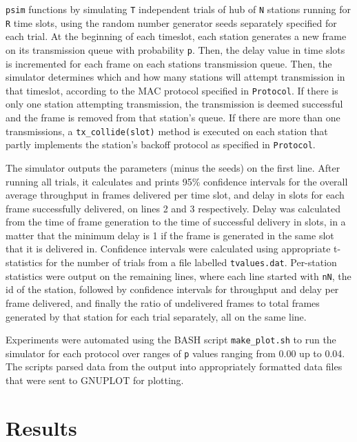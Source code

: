 \documentclass[twocolumn]{article}
\begin{document}
\verb|psim| functions by simulating \verb|T| independent trials of hub of
\verb|N| stations running for \verb|R| time slots, using the random number
generator seeds separately specified for each trial. At the beginning of each
timeslot, each station generates a new frame on its transmission queue with
probability \verb|p|. Then, the delay value in time slots is incremented for
each frame on each stations transmission queue.  Then, the simulator determines
which and how many stations will attempt transmission in that timeslot,
according to the MAC protocol specified in \verb|Protocol|. If there is only one
station attempting transmission, the transmission is deemed successful and the
frame is removed from that station's queue. If there are more than one
transmissions, a \verb|tx_collide(slot)| method is executed on each station that
partly implements the station's backoff protocol as specified in
\verb|Protocol|.

The simulator outputs the parameters (minus the seeds) on the first line. After
running all trials, it calculates and prints 95\% confidence intervals for the
overall average throughput in frames delivered per time slot, and delay in slots
for each frame successfully delivered, on lines 2 and 3 respectively. Delay was 
calculated from the time of frame generation to the time of successful delivery in slots,
in a matter that the minimum delay is 1 if the frame is generated in the same slot that it is
delivered in. Confidence
intervals were calculated using appropriate t-statistics for the number of
trials from a file labelled \verb|tvalues.dat|. Per-station statistics were output
on the remaining lines, where each line started with \verb|nN|, the id of the station,
followed by confidence intervals for throughput and delay per frame delivered, and finally
the ratio of undelivered frames to total frames generated by that station for each trial 
separately, all on the same line.

Experiments were automated using the BASH script \verb|make_plot.sh| 
to run the simulator for each protocol over ranges of \verb|p| values ranging
from 0.00 up to 0.04. The scripts parsed data from the output into appropriately
formatted data files that were sent to GNUPLOT for plotting.

\section*{Results}
\end{document}
